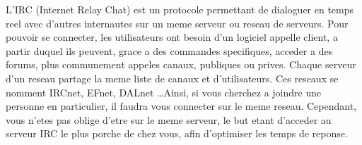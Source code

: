 L'IRC (Internet Relay Chat) est un protocole permettant de dialoguer en temps reel avec d'autres internautes sur un meme serveur ou reseau de serveurs. Pour pouvoir se connecter, les utilisateurs ont besoin d'un logiciel appelle client, a partir duquel ils peuvent, grace a des commandes specifiques, acceder a des forums, plus communement appeles canaux, publiques ou prives. Chaque serveur d'un reseau partage la meme liste de canaux et d'utilisateurs. Ces reseaux se nomment IRCnet, EFnet, DALnet \ldots Ainsi, si vous cherchez a joindre une personne en particulier, il faudra vous connecter sur le meme reseau. Cependant, vous n'etes pas oblige d'etre sur le meme serveur, le but etant d'acceder au serveur IRC le plus porche de chez vous, afin d'optimiser les temps de reponse.          
